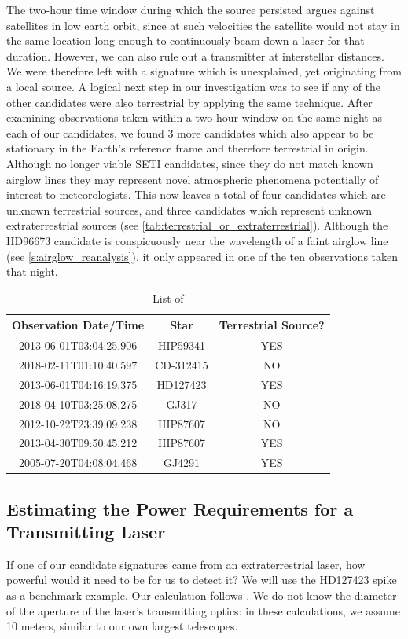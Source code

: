 \documentclass[linenumbers]{aastex631}
\begin{document}
The two-hour time window during which the source persisted argues against satellites in low earth orbit, since at such velocities the satellite would not stay in the same location long enough to continuously beam down a laser for that duration. However, we can also rule out a transmitter at interstellar distances. We were therefore left with a signature which is unexplained, yet originating from a local source. A logical next step in our investigation was to see if any of the other candidates were also terrestrial by applying the same technique. After examining observations taken within a two hour window on the same night as each of our candidates, we found 3 more candidates which also appear to be stationary in the Earth's reference frame and therefore terrestrial in origin.  Although no longer viable SETI candidates, since they do not match known airglow lines they may represent novel atmospheric phenomena potentially of interest to meteorologists. This now leaves a total of four candidates which are unknown terrestrial sources, and three candidates which represent unknown extraterrestrial sources (see \ref{tab:terrestrial_or_extraterrestrial}). Although the HD96673 candidate is conspicuously near the wavelength of a faint airglow line (see \ref{s:airglow_reanalysis}), it only appeared in one of the ten observations taken that night.  

\begin{table}[]
    \centering
    \begin{tabular}{c|c|c}
       Observation Date/Time  & Star & Terrestrial Source? \\
    \hline
       2013-06-01T03:04:25.906 & HIP59341 & YES \\
       2018-02-11T01:10:40.597 & CD-312415 & NO \\
       2013-06-01T04:16:19.375 & HD127423 & YES \\
       2018-04-10T03:25:08.275 & GJ317 & NO \\
       2012-10-22T23:39:09.238 & HIP87607 & NO \\
       2013-04-30T09:50:45.212 & HIP87607 & YES \\
       2005-07-20T04:08:04.468 & GJ4291 & YES \\
    \hline
    \end{tabular}
    \caption{List of }
    \label{tab:terrestrial_or_extraterrestrial?}
\end{table}

\subsection{Estimating the Power Requirements for a Transmitting Laser}
If one of our candidate signatures came from an extraterrestrial laser, how powerful would it need to be for us to detect it?  We will use the HD127423 spike as a benchmark example.  Our calculation follows \cite{Lipman_2019}.  We do not know the diameter of the aperture of the laser’s transmitting optics: in these calculations, we assume 10 meters, similar to our own largest telescopes.
\end{document}
